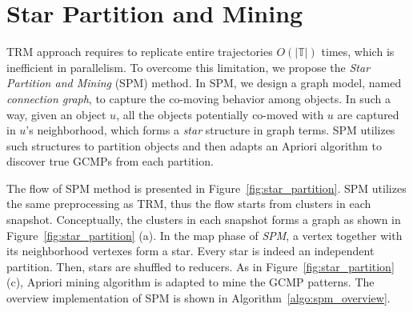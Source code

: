 \section{Star Partition and Mining}
\label{sec:spm}
TRM approach requires to replicate entire
trajectories $O(|\mathbb{T}|)$ times, which is inefficient
in parallelism. To overcome this limitation, we 
propose the \emph{Star Partition and Mining} (SPM) method.
In SPM, we design a graph model, named \emph{connection graph}, to capture 
the co-moving behavior among objects. In such a way, 
given an object $u$, all the objects potentially
co-moved with $u$ are captured in $u$'s neighborhood, which
forms a \emph{star} structure in graph terms. SPM utilizes
such structures to partition objects and then adapts an Apriori 
algorithm to discover true GCMPs from each partition.

The flow of SPM method is presented in Figure~\ref{fig:star_partition}.
SPM utilizes the same preprocessing as TRM, thus the flow starts
from clusters in each snapshot. Conceptually, the clusters 
in each snapshot forms a graph as shown in Figure~\ref{fig:star_partition} (a).
In the map phase of \emph{SPM}, a vertex together with its neighborhood 
vertexes form a star. Every star is indeed an independent partition.
Then, stars are shuffled to reducers. As in
Figure~\ref{fig:star_partition} (c), Apriori mining algorithm is adapted
to mine the GCMP patterns. The overview implementation of SPM is shown 
in Algorithm~\ref{algo:spm_overview}.


